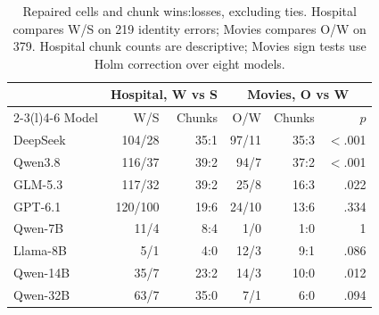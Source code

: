\begin{table}[t]
  \caption{Repaired cells and chunk wins:losses, excluding ties. Hospital compares W/S on 219 identity errors; Movies compares O/W on 379. Hospital chunk counts are descriptive; Movies sign tests use Holm correction over eight models.}
  \label{tab:counts}
  \small
  \setlength{\tabcolsep}{3.5pt}
  \begin{tabular*}{\columnwidth}{@{\extracolsep{\fill}}lrr rrr@{}}
    \toprule
    & \multicolumn{2}{c}{Hospital, W vs S} & \multicolumn{3}{c}{Movies, O vs W} \\
    \cmidrule(lr){2-3}\cmidrule(l){4-6}
    Model & W/S & Chunks & O/W & Chunks & $p$ \\
    \midrule
    DeepSeek & 104/28 & 35:1 & 97/11 & 35:3 & $<$.001 \\
    Qwen3.8 & 116/37 & 39:2 & 94/7 & 37:2 & $<$.001 \\
    GLM-5.3 & 117/32 & 39:2 & 25/8 & 16:3 & .022 \\
    GPT-6.1 & 120/100 & 19:6 & 24/10 & 13:6 & .334 \\
    Qwen-7B & 11/4 & 8:4 & 1/0 & 1:0 & 1 \\
    Llama-8B & 5/1 & 4:0 & 12/3 & 9:1 & .086 \\
    Qwen-14B & 35/7 & 23:2 & 14/3 & 10:0 & .012 \\
    Qwen-32B & 63/7 & 35:0 & 7/1 & 6:0 & .094 \\
    \bottomrule
  \end{tabular*}
\end{table}
